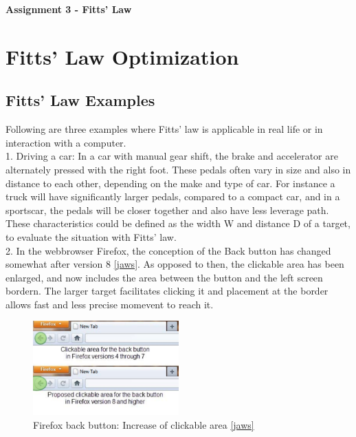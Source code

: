 \documentclass[a4paper,twoside,10pt]{article}
\begin{document}
\pagestyle{fancyplain}


\renewcommand{\headrulewidth}{0px}

\begin{center}
\huge{\textbf{Assignment 3 - Fitts' Law}}
\end{center}
\vspace{.5cm}

\section{Fitts' Law Optimization} 
\subsection{Fitts' Law Examples} 
Following are three examples where Fitts' law is applicable in real life or in interaction with a computer.\\
	1. Driving a car: In a car with manual gear shift, the brake and accelerator are alternately pressed with the right foot. These pedals often vary in size and also in distance to each other, depending on the make and type of car. For instance a truck will have significantly larger pedals, compared to a compact car, and in a sportscar, the pedals will be closer together and also have less leverage path. These characteristics could be defined as the width W and distance D of a target, to evaluate the situation with Fitts' law.\\
	2. In the webbrowser Firefox, the conception of the Back button has changed somewhat after version 8 \ref{jaws}. As opposed to then, the clickable area has been enlarged, and now includes the area between the button and the left screen bordern. The larger target facilitates clicking it and placement at the border allows fast and less precise momevent to reach it. \\ 

\begin{figure}[h]
	\centering
		\includegraphics[width=0.50\textwidth]{firefox.pdf}
	\caption{Firefox back button: Increase of clickable area \ref{jaws}}
	\label{fig:firefox}
\end{figure}
\end{document}
